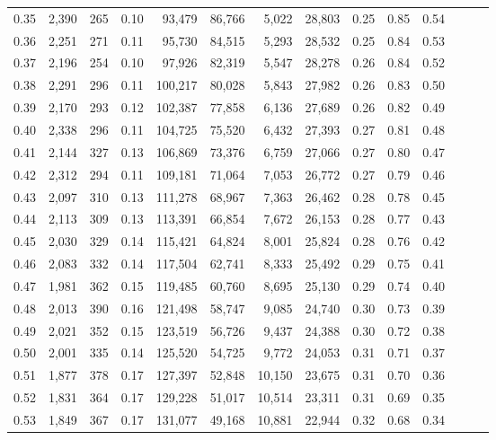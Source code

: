 \begin{tabular}{rrrrrrrrrrrrrr}
0.35 &  2,390 &  265 &  0.10 &   93,479 &   86,766 &   5,022 &  28,803 &  0.25 &  0.85 &      0.54 \\
0.36 &  2,251 &  271 &  0.11 &   95,730 &   84,515 &   5,293 &  28,532 &  0.25 &  0.84 &      0.53 \\
0.37 &  2,196 &  254 &  0.10 &   97,926 &   82,319 &   5,547 &  28,278 &  0.26 &  0.84 &      0.52 \\
0.38 &  2,291 &  296 &  0.11 &  100,217 &   80,028 &   5,843 &  27,982 &  0.26 &  0.83 &      0.50 \\
0.39 &  2,170 &  293 &  0.12 &  102,387 &   77,858 &   6,136 &  27,689 &  0.26 &  0.82 &      0.49 \\
0.40 &  2,338 &  296 &  0.11 &  104,725 &   75,520 &   6,432 &  27,393 &  0.27 &  0.81 &      0.48 \\
0.41 &  2,144 &  327 &  0.13 &  106,869 &   73,376 &   6,759 &  27,066 &  0.27 &  0.80 &      0.47 \\
0.42 &  2,312 &  294 &  0.11 &  109,181 &   71,064 &   7,053 &  26,772 &  0.27 &  0.79 &      0.46 \\
0.43 &  2,097 &  310 &  0.13 &  111,278 &   68,967 &   7,363 &  26,462 &  0.28 &  0.78 &      0.45 \\
0.44 &  2,113 &  309 &  0.13 &  113,391 &   66,854 &   7,672 &  26,153 &  0.28 &  0.77 &      0.43 \\
0.45 &  2,030 &  329 &  0.14 &  115,421 &   64,824 &   8,001 &  25,824 &  0.28 &  0.76 &      0.42 \\
0.46 &  2,083 &  332 &  0.14 &  117,504 &   62,741 &   8,333 &  25,492 &  0.29 &  0.75 &      0.41 \\
0.47 &  1,981 &  362 &  0.15 &  119,485 &   60,760 &   8,695 &  25,130 &  0.29 &  0.74 &      0.40 \\
0.48 &  2,013 &  390 &  0.16 &  121,498 &   58,747 &   9,085 &  24,740 &  0.30 &  0.73 &      0.39 \\
0.49 &  2,021 &  352 &  0.15 &  123,519 &   56,726 &   9,437 &  24,388 &  0.30 &  0.72 &      0.38 \\
0.50 &  2,001 &  335 &  0.14 &  125,520 &   54,725 &   9,772 &  24,053 &  0.31 &  0.71 &      0.37 \\
0.51 &  1,877 &  378 &  0.17 &  127,397 &   52,848 &  10,150 &  23,675 &  0.31 &  0.70 &      0.36 \\
0.52 &  1,831 &  364 &  0.17 &  129,228 &   51,017 &  10,514 &  23,311 &  0.31 &  0.69 &      0.35 \\
0.53 &  1,849 &  367 &  0.17 &  131,077 &   49,168 &  10,881 &  22,944 &  0.32 &  0.68 &      0.34 \\

\end{tabular}
